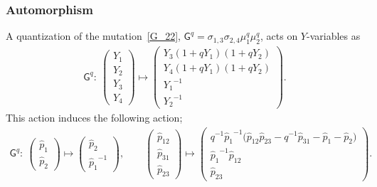 \documentclass[pdftex]{sigma}
\numberwithin{equation}{section}
\begin{document}
\subsubsection*{Automorphism}
A quantization of the mutation~\eqref{G_22}, $\mathsf{G}^q = \sigma_{1,3} \sigma_{2,4} \mu^q_1 \mu^q_2 $, acts on $Y$-variables as
\begin{gather*}
 \mathsf{G}^q\colon \
 \begin{pmatrix}
 Y_1 \\ Y_2 \\ Y_3 \\Y_4
 \end{pmatrix}
 \mapsto
 \begin{pmatrix}
 Y_3 ( 1+q Y_1 ) ( 1+q Y_2 ) \\
 Y_4 ( 1+q Y_1 ) ( 1+q Y_2 ) \\
 {Y_1}^{-1} \\
 {Y_2}^{-1}
 \end{pmatrix} .
\end{gather*}
This action induces the following action;
\begin{gather*}
 \mathsf{G}^q \colon \
 \begin{pmatrix}
 \hat{p}_1 \\
 \hat{p}_2
 \end{pmatrix}
 \mapsto
 \begin{pmatrix}
 \hat{p}_2 \\
 {\hat{p}_1}^{-1}
 \end{pmatrix} ,
 \qquad
 \begin{pmatrix}
 \hat{p}_{12} \\
 \hat{p}_{31} \\
 \hat{p}_{23}
 \end{pmatrix}
 \mapsto
 \begin{pmatrix}
 q^{-1} {\hat{p}_1}^{-1} \big( \hat{p}_{12} \hat{p}_{23} - q^{-1} \hat{p}_{31} - \hat{p}_1 - \hat{p}_2 \big) \\
 {\hat{p}_1}^{-1} \hat{p}_{12} \\
 \hat{p}_{23}
 \end{pmatrix} .
\end{gather*}
\end{document}
